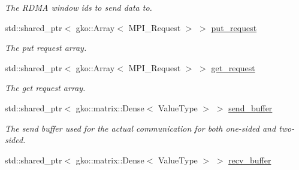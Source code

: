 \begin{DoxyCompactItemize}
\begin{DoxyCompactList}\small\item\em The R\+D\+MA window ids to send data to. \end{DoxyCompactList}\item 
\mbox{\label{structSchwarzWrappers_1_1Communicate_1_1comm__struct_aa2927d31c575f19ae7069696fca3048e}} 
std\+::shared\+\_\+ptr$<$ gko\+::\+Array$<$ M\+P\+I\+\_\+\+Request $>$ $>$ \hyperlink{structSchwarzWrappers_1_1Communicate_1_1comm__struct_aa2927d31c575f19ae7069696fca3048e}{put\+\_\+request}
\begin{DoxyCompactList}\small\item\em The put request array. \end{DoxyCompactList}\item 
\mbox{\label{structSchwarzWrappers_1_1Communicate_1_1comm__struct_a8991ebcfd69775b0d9de04aaec08fdaa}} 
std\+::shared\+\_\+ptr$<$ gko\+::\+Array$<$ M\+P\+I\+\_\+\+Request $>$ $>$ \hyperlink{structSchwarzWrappers_1_1Communicate_1_1comm__struct_a8991ebcfd69775b0d9de04aaec08fdaa}{get\+\_\+request}
\begin{DoxyCompactList}\small\item\em The get request array. \end{DoxyCompactList}\item 
\mbox{\label{structSchwarzWrappers_1_1Communicate_1_1comm__struct_a41a958e3aee95fab40d506658ab0513a}} 
std\+::shared\+\_\+ptr$<$ gko\+::matrix\+::\+Dense$<$ Value\+Type $>$ $>$ \hyperlink{structSchwarzWrappers_1_1Communicate_1_1comm__struct_a41a958e3aee95fab40d506658ab0513a}{send\+\_\+buffer}
\begin{DoxyCompactList}\small\item\em The send buffer used for the actual communication for both one-\/sided and two-\/sided. \end{DoxyCompactList}\item 
\mbox{\label{structSchwarzWrappers_1_1Communicate_1_1comm__struct_a24a51462f66fa2792ef1d6bc848678ea}} 
std\+::shared\+\_\+ptr$<$ gko\+::matrix\+::\+Dense$<$ Value\+Type $>$ $>$ \hyperlink{structSchwarzWrappers_1_1Communicate_1_1comm__struct_a24a51462f66fa2792ef1d6bc848678ea}{recv\+\_\+buffer}

\end{DoxyCompactItemize}
